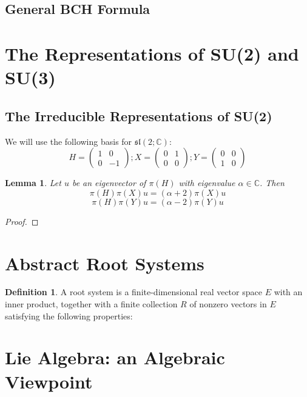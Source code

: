 \documentclass{book}
\newtheorem{lemma}{Lemma}[section]
\theoremstyle{definition}
\newtheorem{definition}{Definition}[section]
\begin{document}
\subsection{General BCH Formula}


\section{The Representations of SU(2) and SU(3)}
\subsection{The Irreducible Representations of SU(2)}
We will use the following basis for $\mathfrak{sl}(2;\mathbb{C})$:
\[H=\begin{pmatrix}
    1 & 0 \\
    0 & -1
   \end{pmatrix};X=\begin{pmatrix}
    0 & 1\\
    0 & 0
   \end{pmatrix};Y=\begin{pmatrix}
    0 & 0\\
     1 & 0
   \end{pmatrix}\]

\begin{lemma}
    Let $u$ be an eigenvector of $\pi(H)$ with eigenvalue $\alpha\in\mathbb{C}$. Then 
    \[\pi(H)\pi(X)u=(\alpha+2)\pi(X)u\] 
    \[\pi(H)\pi(Y)u=(\alpha-2)\pi(Y)u\]
\end{lemma}
\begin{proof}
    
\end{proof}

\section{Abstract Root Systems}
\begin{definition}
    A root system is a finite-dimensional real vector space $E$ with an inner product,
    together with a finite collection $R$ of nonzero vectors in $E$ satisfying the following properties:
\end{definition}

\section{Lie Algebra: an Algebraic Viewpoint}
\end{document}
